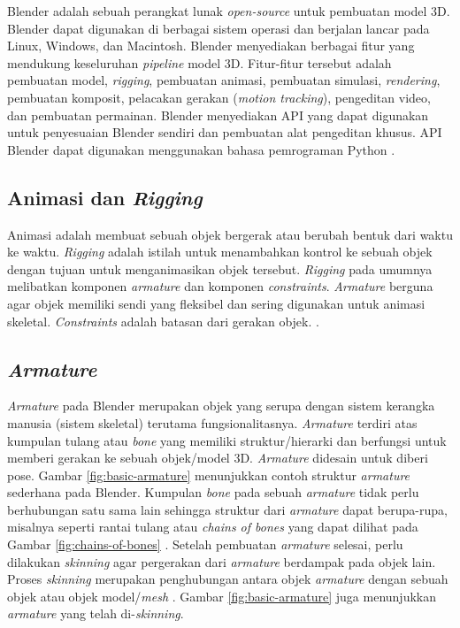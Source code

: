 Blender adalah sebuah perangkat lunak \textit{open-source} untuk pembuatan model
3D. Blender dapat digunakan di berbagai sistem operasi dan berjalan lancar pada
Linux, Windows, dan Macintosh. Blender menyediakan berbagai fitur yang mendukung
keseluruhan \textit{pipeline} model 3D. Fitur-fitur tersebut adalah pembuatan
model, \textit{rigging}, pembuatan animasi, pembuatan simulasi,
\textit{rendering}, pembuatan komposit, pelacakan gerakan (\textit{motion
tracking}), pengeditan video, dan pembuatan permainan. Blender menyediakan API
yang dapat digunakan untuk penyesuaian Blender sendiri dan pembuatan alat
pengeditan khusus. API Blender dapat digunakan menggunakan bahasa pemrograman
Python \parencite{blender-about}.

\subsection{Animasi dan \textit{Rigging}}

Animasi adalah membuat sebuah objek
bergerak atau berubah bentuk dari waktu ke waktu. \textit{Rigging} adalah
istilah untuk menambahkan kontrol ke sebuah objek dengan tujuan untuk
menganimasikan objek tersebut. \textit{Rigging} pada umumnya melibatkan komponen
\textit{armature} dan komponen \textit{constraints}. \textit{Armature} berguna
agar objek memiliki sendi yang fleksibel dan sering digunakan untuk animasi
skeletal. \textit{Constraints} adalah batasan dari gerakan objek.
\parencite{blender-animation-and-rigging}.

\subsection{\textit{Armature}}

\textit{Armature} pada Blender merupakan objek yang serupa dengan sistem
kerangka manusia (sistem skeletal) terutama fungsionalitasnya. \textit{Armature}
terdiri atas kumpulan tulang atau \textit{bone} yang memiliki struktur/hierarki
dan berfungsi untuk memberi gerakan ke sebuah objek/model 3D. \textit{Armature}
didesain untuk diberi pose. Gambar \ref{fig:basic-armature} menunjukkan contoh
struktur \textit{armature} sederhana pada Blender. Kumpulan \textit{bone} pada
sebuah \textit{armature} tidak perlu berhubungan satu sama lain sehingga
struktur dari \textit{armature} dapat berupa-rupa, misalnya seperti rantai
tulang atau \textit{chains of bones} yang dapat dilihat pada Gambar
\ref{fig:chains-of-bones} \parencite{blender-armature-introduction,
blender-armature-structure}. Setelah pembuatan \textit{armature} selesai, perlu
dilakukan \textit{skinning} agar pergerakan dari \textit{armature} berdampak
pada objek lain. Proses \textit{skinning} merupakan penghubungan antara objek
\textit{armature} dengan sebuah objek atau objek model/\textit{mesh}
\parencite{blender-skinning-introduction}. Gambar \ref{fig:basic-armature} juga
menunjukkan \textit{armature} yang telah di-\textit{skinning}.

